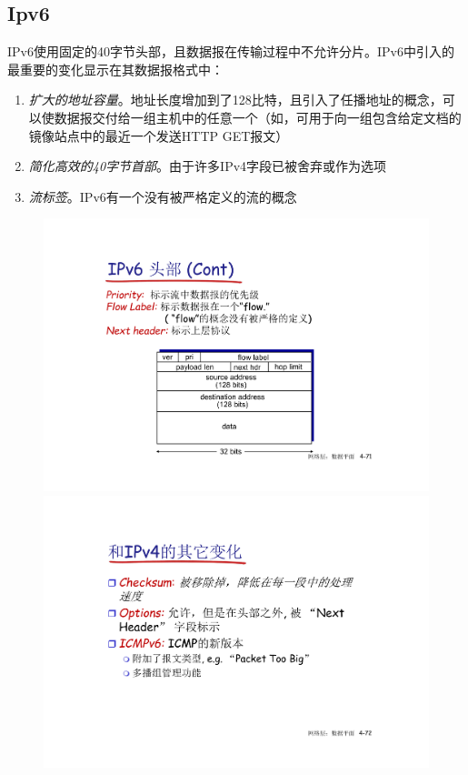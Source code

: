 \documentclass[]{report}
\begin{document}
		\subsection{Ipv6}
		IPv6使用固定的40字节头部，且数据报在传输过程中不允许分片。IPv6中引入的最重要的变化显示在其数据报格式中：
		\begin{enumerate}
			\item \textit{扩大的地址容量}。地址长度增加到了128比特，且引入了任播地址的概念，可以使数据报交付给一组主机中的任意一个（如，可用于向一组包含给定文档的镜像站点中的最近一个发送HTTP GET报文）
			\item \textit{简化高效的40字节首部}。由于许多IPv4字段已被舍弃或作为选项
			\item \textit{流标签}。IPv6有一个没有被严格定义的流的概念
		\end{enumerate}
		\begin{figure}[h]
			\centering
			\begin{minipage}{20em}
				\centering
				\includegraphics[scale = 0.3]{images/IPv6_header.pdf}
			\end{minipage}
			\begin{minipage}{20em}
				\centering
				\includegraphics[scale = 0.3]{images/IPv6_changes_from_IPv4.pdf}
			\end{minipage}
		\end{figure}
\end{document}
